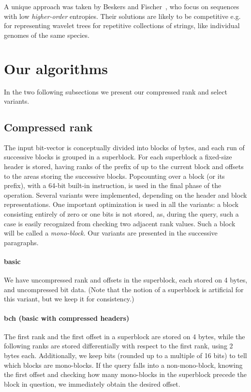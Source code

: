 \documentclass{llncs}
\begin{document}
A unique approach was taken by Beskers and Fischer~\cite{BF14}, 
who focus on sequences with low {\em higher-order} entropies. 
Their solutions are likely to be competitive e.g. 
for representing wavelet trees for repetitive collections of
strings, like individual genomes of the same species.



\section{Our algorithms}

In the two following subsections we present our compressed rank and select 
variants.

\subsection{Compressed rank}
\label{sec:crank}
The input bit-vector  is conceptually divided into blocks of  bytes, 
and each run of  successive blocks is grouped in a superblock.
For each superblock a fixed-size header is stored, having  ranks of the 
prefix of  up to the current block and  offsets to the areas storing the 
successive blocks.
Popcounting over a block (or its prefix), with a 64-bit built-in instruction, 
is used in the final phase of the operation.
Several variants were implemented, depending on the header and 
block representations.
One important optimization is used in all the variants:
a block consisting entirely of zero or one bits is not stored, as, 
during the query, such a case is easily recognized from checking 
two adjacent rank values.
Such a block will be called a {\em mono-block}.
Our variants are presented in the successive paragraphs.

\paragraph*{\textbf{basic}}
We have uncompressed rank and offsets in the superblock, 
each stored on 4 bytes, and uncompressed bit data.
(Note that the notion of a superblock is artificial for this variant, 
but we keep it for consistency.)


\paragraph*{\textbf{bch (basic with compressed headers)}}
The first rank and the first offset in a superblock are stored on 4 bytes, 
while the following  ranks are stored differentially 
with respect to the first rank, using 2 bytes each.
Additionally, we keep  bits (rounded up to a multiple of 16 bits) 
to tell which blocks are mono-blocks.
If the query falls into a non-mono-block, knowing the first offset and 
checking how many mono-blocks in the superblock precede the block in question, 
we immediately obtain the desired offset.
\end{document}
